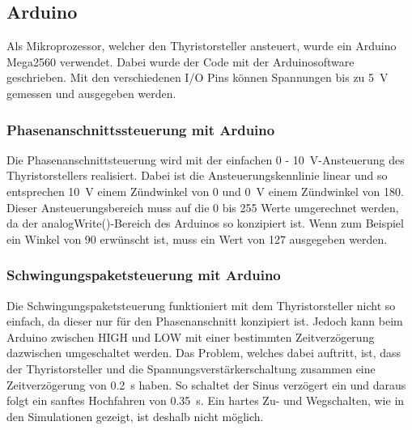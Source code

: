 \subsection{Arduino}

Als Mikroprozessor, welcher den Thyristorsteller ansteuert, wurde ein Arduino Mega2560 verwendet. Dabei wurde der Code mit der Arduinosoftware geschrieben. Mit den verschiedenen I/O Pins können Spannungen bis zu \SI{5}{V} gemessen und ausgegeben werden.
 

\subsubsection*{Phasenanschnittssteuerung mit Arduino}
Die Phasenanschnittsteuerung wird mit der einfachen 0 - \SI{10}{V}-Ansteuerung des Thyristorstellers realisiert. Dabei ist die Ansteuerungskennlinie linear und so entsprechen \SI{10}{V} einem Zündwinkel von 0\textdegree\hspace{0.02cm} und \SI{0}{V} einem Zündwinkel von 180\textdegree. Dieser Ansteuerungsbereich muss auf die 0 bis 255 Werte umgerechnet werden, da der analogWrite()-Bereich des Arduinos so konzipiert ist. Wenn zum Beispiel ein Winkel von 90\textdegree \hspace{0.02cm} erwünscht ist, muss ein Wert von 127 ausgegeben werden.

\subsubsection*{Schwingungspaketsteuerung mit Arduino}
Die Schwingungspaketsteuerung funktioniert mit dem Thyristorsteller nicht so einfach, da dieser nur für den Phasenanschnitt konzipiert ist. Jedoch kann beim Arduino zwischen HIGH und LOW mit einer bestimmten Zeitverzögerung dazwischen umgeschaltet werden. Das Problem, welches dabei auftritt, ist, dass der Thyristorsteller und die Spannungsverstärkerschaltung zusammen eine Zeitverzögerung von \SI{0.2}{s} haben. So schaltet der Sinus verzögert ein und daraus folgt ein sanftes Hochfahren von \SI{0.35}{s}. Ein hartes Zu- und Wegschalten, wie in den Simulationen gezeigt, ist deshalb nicht möglich.


